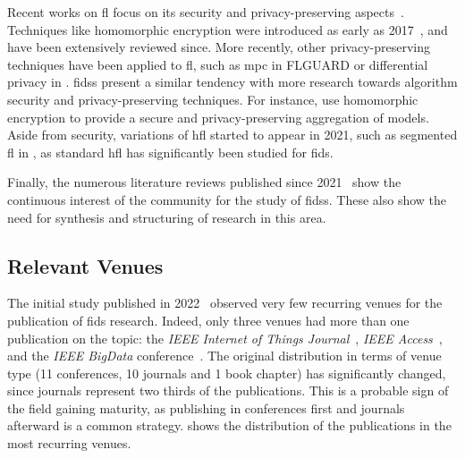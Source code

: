 Recent works on \gls{fl} focus on its security and privacy-preserving aspects~\cite{nguyen_PoisoningAttacksFederated_2020b,lyu_ThreatsFederatedLearning_2020,mothukuri_surveysecurityprivacy_2021}.
Techniques like homomorphic encryption were introduced as early as 2017~\cite{hardy_Privatefederatedlearning_2017}, and have been extensively reviewed since.
More recently, other privacy-preserving techniques have been applied to \gls{fl}, such as \gls{mpc} in FLGUARD
\cite{nguyen_FLGUARDSecurePrivate_2021} or differential privacy in \cite{kim_FederatedLearningLocal_2021}.
\Glspl{fids} present a similar tendency with more research towards algorithm security and privacy-preserving techniques.
For instance, \textcite{li_DeepFedFederatedDeep_2020} use homomorphic encryption to provide a secure and privacy-preserving aggregation of models.
Aside from security, variations of \gls{hfl} started to appear in 2021, such as segmented \gls{fl} in
\cite{sun_AdaptiveFederatedLearning_2020}, as standard \gls{hfl} has significantly been studied for \gls{fids}.

Finally, the numerous literature reviews published since 2021~\cite{agrawal_FederatedLearningintrusion_2022,alazab_FederatedLearningCybersecurity_2021,campos_EvaluatingFederatedLearning_2022,lavaur_EvolutionFederatedLearningbased_2022,fedorchenko_ComparativeReviewIntrusion_2022,ghimire_RecentAdvancesFederated_2022,ismaila_ReviewApproachesFederated_2024} show the
continuous interest of the community for the study of \glspl{fids}.
These also show the need for synthesis and structuring of research in this area.


\subsection{Relevant Venues\label{sec:sota.quanti.venues}}

The initial study published in 2022~\cite{lavaur_EvolutionFederatedLearningbased_2022} observed very few recurring venues for the publication of \gls{fids} research.
Indeed, only three venues had more than one publication on the topic: the \emph{IEEE Internet of Things Journal}~\cite{popoola_FederatedDeepLearning_2021,zhang_BlockchainbasedFederatedLearning_2020}, \emph{IEEE
Access}~\cite{chen_IntrusionDetectionWireless_2020,li_DistributedNetworkIntrusion_2020}, and the \emph{IEEE BigData} conference~\cite{cetin_FederatedWirelessNetwork_2019,fan_IoTDefenderFederatedTransfer_2020}.
The original distribution in terms of venue type (11 conferences, 10 journals and 1 book chapter) has significantly changed, since journals represent two thirds of the publications.
This is a probable sign of the field gaining maturity, as publishing in conferences first and journals afterward is a common strategy.
 shows the distribution of the publications in the most recurring venues.


